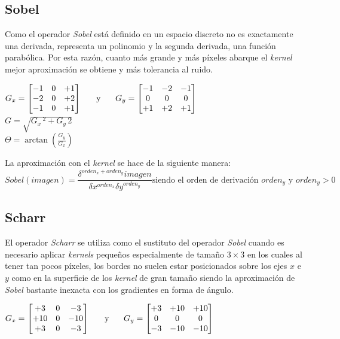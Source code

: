 \subsection{Sobel}
Como el operador \emph{Sobel} está definido en un espacio discreto no
es exactamente una derivada, representa un polinomio y la segunda
derivada, una función parabólica. Por esta razón, cuanto más grande y
más píxeles abarque el \emph{kernel} mejor aproximación se obtiene y
más tolerancia al ruido.
\begin{center}
  $ G_x = \begin{bmatrix}
    -1 & 0 & +1 \\
    -2 & 0 & +2 \\
    -1 & 0 & +1 \\
  \end{bmatrix}
  \hspace{0.5cm} \text{ y } \hspace{0.5cm} G_y = \begin{bmatrix}
    -1 & -2 & -1 \\
    0 & 0 & 0 \\
    +1 & +2 & +1 \\
  \end{bmatrix}
  $
  \\[0.5cm]
  $G = \sqrt{G_x\,^2 + G_y\,{2}}$
  \\[0.5cm]
  $\Theta= \arctan\left(\frac{G_y}{G_x} \right)$
\end{center}
La aproximación con el \emph{kernel} se hace de la siguiente manera:
\begin{equation*}
  Sobel(imagen) = \frac{\delta^{orden_x + orden_y} imagen}{\delta x^{orden_x} \delta
    y^{orden_y}} \text{siendo el orden de derivación } orden_y \text{ y } orden_y > 0
\end{equation*}

\subsection{Scharr}
El operador \emph{Scharr} se utiliza como el sustituto del operador
\emph{Sobel} cuando es necesario aplicar \emph{kernels} pequeños
especialmente de tamaño $3 \times 3$ en los cuales al tener tan pocos
píxeles, los bordes no suelen estar posicionados sobre los ejes $x$ e
$y$ como en la superficie de los \emph{kernel} de gran tamaño siendo
la aproximación de \emph{Sobel} bastante inexacta con los gradientes
en forma de ángulo.
\begin{center}
  $ G_x = \begin{bmatrix}
    +3 & 0 & -3 \\
    +10 & 0 & -10 \\
    +3 & 0 & -3 \\
  \end{bmatrix}
  \hspace{0.5cm} \text{ y } \hspace{0.5cm} G_y = \begin{bmatrix}
    +3 & +10 & +10 \\
    0 & 0 & 0 \\
    -3 & -10 & -10 \\
  \end{bmatrix}
  $
\end{center}
